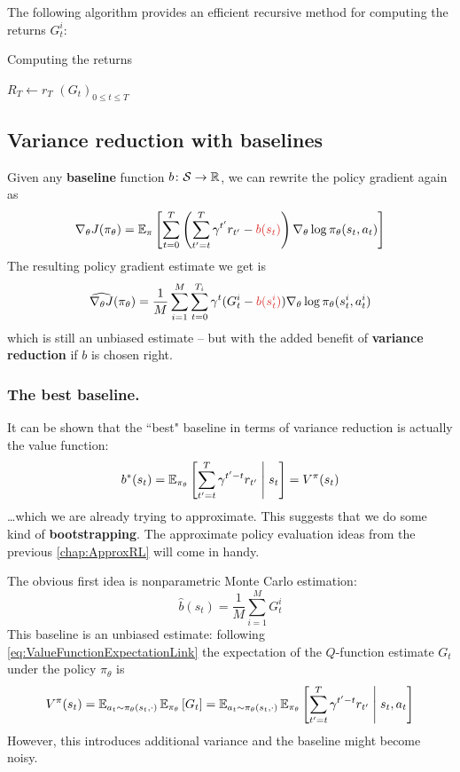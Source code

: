 \documentclass[../course-notes.tex]{subfiles}
\begin{document}
The following algorithm provides an efficient recursive method for computing the returns $G^i_t$:

\begin{algorithm}
	\caption{Computing the returns}\label{algo:ComputeReturnsEfficient}
	$R_T \leftarrow r_T$\;
	\Return $(G_t)_{0\leq t\leq T}$\;
\end{algorithm}


\subsection{Variance reduction with baselines}

Given any \textbf{\bluefont baseline} function $b\colon \mathcal{S} \to \mathbb{R}$, we can rewrite the policy gradient again as
\begin{equation}\label{eq:PolicyGradBaseline}
\nabla_\theta J(\pi_\theta) =
\EE_\pi \left[
\sum_{t=0}^T
\left(
\sum_{t'=t}^T \gamma^{t'} r_{t'} - {\redfont b(s_t)}
\right)
\nabla_\theta \log\pi_\theta(s_t, a_t)
\right]
\end{equation}
The resulting policy gradient estimate we get is
\begin{equation}\label{eq:MCPolicyGradBaseline}
\widehat{\nabla_\theta J}(\pi_\theta) =
\frac{1}{M}\sum_{i=1}^M
\sum_{t=0}^{T_i}
\gamma^t (G^i_t - {\redfont b(s^i_t)})
\nabla_\theta \log\pi_\theta (s_t^i, a_t^i)
\end{equation}
which is still an unbiased estimate -- but with the added benefit of \textbf{variance reduction} if $b$ is chosen right.

\subsubsection{The best baseline.}

It can be shown that the ``best" baseline in terms of variance reduction is actually the value function:
\[
b^*(s_t) = \operatorname{\mathbb{E}}_{\pi_\theta}\left[\sum_{t'=t}^T \gamma^{t'-t} r_{t'} \;\middle|\; s_t \right]
= V^\pi(s_t)
\]
\ldots which we are already trying to approximate. This suggests that we do some kind of \textbf{bootstrapping}. The approximate policy evaluation ideas from the previous \cref{chap:ApproxRL} will come in handy.

The obvious first idea is nonparametric Monte Carlo estimation:
\[
	\widehat{b}(s_t) = \frac{1}{M}\sum_{i=1}^M G^i_t
\]
This baseline is an unbiased estimate: following \cref{eq:ValueFunctionExpectationLink} the expectation of the $Q$-function estimate $G_t$ under the policy $\pi_\theta$ is
\[
	V^\pi(s_t) =
	\operatorname{\mathbb{E}}_{a_t\sim \pi_\theta(s_t,\cdot)}
	\operatorname{\mathbb{E}}_{\pi_\theta}
	\left[G_t\right] =
	\operatorname{\mathbb{E}}_{a_t\sim\pi_\theta(s_t,\cdot)}
	\operatorname{\mathbb{E}}_{\pi_\theta}
	\left[
	\sum_{t'=t}^T \gamma^{t'-t}r_{t'}
	\;\middle|\; s_t,a_t
	\right]
\]
However, this introduces additional variance and the baseline might become noisy.
\end{document}
